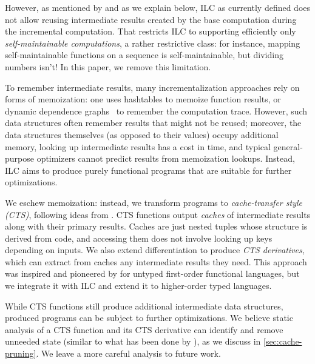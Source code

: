 However, as mentioned by \citeauthor{CaiEtAl2014ILC} and as we explain below,
ILC as currently defined does not allow reusing intermediate results created by the
base computation during the incremental computation. That restricts ILC to
supporting efficiently only \emph{self-maintainable computations}, a rather
restrictive class: for instance, mapping self-maintainable functions on a sequence is
self-maintainable, but dividing numbers isn't! In this paper, we remove this
limitation.


To remember intermediate results, many incrementalization approaches rely on
forms of memoization: one uses hashtables to memoize function results, or
dynamic dependence graphs~\citep{Acar05} to remember the computation trace.
However, such data structures often remember results that might not be reused;
moreover, the data structures themselves (as opposed to their values) occupy
additional memory, looking up intermediate results has a cost in time, and
typical general-purpose optimizers cannot predict results from memoization
lookups. Instead, ILC aims to produce purely functional programs that are
suitable for further optimizations.

We eschew memoization: instead, we transform programs to
\emph{cache-transfer style (CTS)}, following ideas from \citet{Liu95}. CTS functions
output \emph{caches} of intermediate results along with their primary results. Caches
are just nested tuples whose structure is derived from code, and accessing them
does not involve looking up keys depending on inputs. We also extend
differentiation to produce \emph{CTS derivatives}, which can extract from caches
any intermediate results they need.
This approach was inspired and pioneered by \citeauthor{Liu95} for untyped
first-order functional languages, but we integrate
it with ILC and extend it to higher-order typed languages.

%
While CTS functions still produce additional intermediate data structures,
produced programs can be subject to further optimizations.
We believe static analysis of a CTS function and its CTS derivative can identify
and remove unneeded state (similar to what has been done by \citeauthor{Liu95}),
as we discuss in \cref{sec:cache-pruning}.
We leave a more careful analysis to future work.

